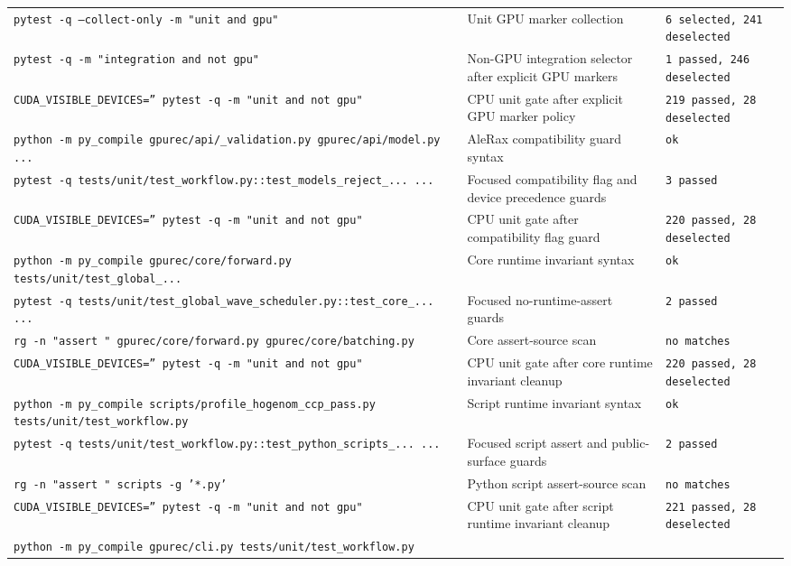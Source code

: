 \documentclass[11pt]{article}
\begin{document}
\begin{center}
\begin{tabular}{lll}
\texttt{pytest -q --collect-only -m "unit and gpu"} &
Unit GPU marker collection &
\texttt{6 selected, 241 deselected} \\
\texttt{pytest -q -m "integration and not gpu"} &
Non-GPU integration selector after explicit GPU markers &
\texttt{1 passed, 246 deselected} \\
\texttt{CUDA\_VISIBLE\_DEVICES='' pytest -q -m "unit and not gpu"} &
CPU unit gate after explicit GPU marker policy &
\texttt{219 passed, 28 deselected} \\
\texttt{python -m py\_compile gpurec/api/\_validation.py gpurec/api/model.py ...} &
AleRax compatibility guard syntax &
\texttt{ok} \\
\texttt{pytest -q tests/unit/test\_workflow.py::test\_models\_reject\_... ...} &
Focused compatibility flag and device precedence guards &
\texttt{3 passed} \\
\texttt{CUDA\_VISIBLE\_DEVICES='' pytest -q -m "unit and not gpu"} &
CPU unit gate after compatibility flag guard &
\texttt{220 passed, 28 deselected} \\
\texttt{python -m py\_compile gpurec/core/forward.py tests/unit/test\_global\_...} &
Core runtime invariant syntax &
\texttt{ok} \\
\texttt{pytest -q tests/unit/test\_global\_wave\_scheduler.py::test\_core\_... ...} &
Focused no-runtime-assert guards &
\texttt{2 passed} \\
\texttt{rg -n "assert " gpurec/core/forward.py gpurec/core/batching.py} &
Core assert-source scan &
\texttt{no matches} \\
\texttt{CUDA\_VISIBLE\_DEVICES='' pytest -q -m "unit and not gpu"} &
CPU unit gate after core runtime invariant cleanup &
\texttt{220 passed, 28 deselected} \\
\texttt{python -m py\_compile scripts/profile\_hogenom\_ccp\_pass.py tests/unit/test\_workflow.py} &
Script runtime invariant syntax &
\texttt{ok} \\
\texttt{pytest -q tests/unit/test\_workflow.py::test\_python\_scripts\_... ...} &
Focused script assert and public-surface guards &
\texttt{2 passed} \\
\texttt{rg -n "assert " scripts -g '*.py'} &
Python script assert-source scan &
\texttt{no matches} \\
\texttt{CUDA\_VISIBLE\_DEVICES='' pytest -q -m "unit and not gpu"} &
CPU unit gate after script runtime invariant cleanup &
\texttt{221 passed, 28 deselected} \\
\texttt{python -m py\_compile gpurec/cli.py tests/unit/test\_workflow.py} &

\end{tabular}
\end{center}
\end{document}
